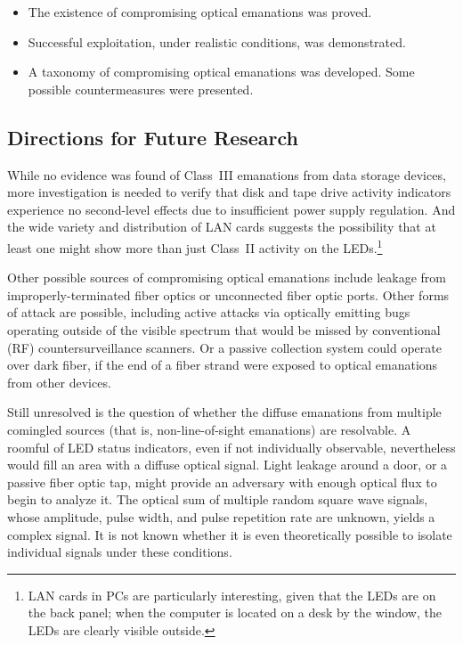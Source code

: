 \documentclass[twocolumn]{article}
\begin{document}
\begin{itemize}

\item The existence of compromising optical emanations was proved.

\item Successful exploitation, under realistic conditions, was demonstrated.

\item A taxonomy of compromising optical emanations was developed.
Some possible countermeasures were presented.

\end{itemize}

\subsection{Directions for Future Research}

While no evidence was found of Class~III emanations from data storage devices, more investigation is needed to verify that disk and tape drive activity indicators experience no second-level effects due to insufficient power supply regulation.  And the wide variety and distribution of LAN cards suggests the possibility that at least one might show more than just Class~II activity on the LEDs.\footnote{LAN cards in PCs are particularly interesting, given that the LEDs are on the back panel; when the computer is located on a desk by the window, the LEDs are clearly visible outside.}

Other possible sources of compromising optical emanations include leakage from improperly-terminated fiber optics or unconnected fiber optic ports.  Other forms of attack are possible, including active attacks via optically emitting bugs operating outside of the visible spectrum that would be missed by conventional (RF) countersurveillance scanners.  Or a passive collection system could operate over dark fiber, if the end of a fiber strand were exposed to optical emanations from other devices.

Still unresolved is the question of whether the diffuse emanations from multiple comingled sources (that is, non-line-of-sight emanations) are resolvable.  A roomful of LED status indicators, even if not individually observable, nevertheless would fill an area with a diffuse optical signal.  Light leakage around a door, or a passive fiber optic tap, might provide an adversary with enough optical flux to begin to analyze it. The optical sum of multiple random square wave signals, whose amplitude, pulse width, and pulse repetition rate are unknown, yields a complex signal.  It is not known whether it is even theoretically possible to isolate individual signals under these conditions.
\end{document}
